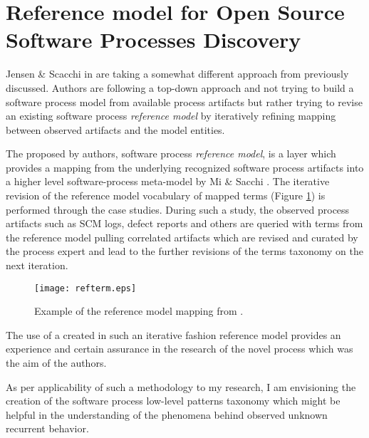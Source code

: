 \section{Reference model for Open Source Software Processes Discovery}
Jensen \& Scacchi in \cite{citeulike:5043664} are taking a somewhat different approach from previously discussed. Authors are following a top-down approach and not trying to build a software process model from available process artifacts but rather trying to revise an existing software process \textit{reference model} by iteratively refining mapping between observed artifacts and the model entities. 

The proposed by authors, software process \textit{reference model}, is a layer which provides a mapping from the underlying recognized software process artifacts into a higher level software-process meta-model by Mi \& Sacchi \cite{citeulike:5128872}. The iterative revision of the reference model vocabulary of mapped terms (Figure \ref{fig:refterm}) is performed through the case studies. During such a study, the observed process artifacts such as SCM logs, defect reports and others are queried with terms from the reference model pulling correlated artifacts which are revised and curated by the process expert and lead to the further revisions of the terms taxonomy on the next iteration.

\begin{figure}[tbp]
   \centering
   \texttt{[image: refterm.eps]}
   \caption{Example of the reference model mapping from \cite{citeulike:5043664}.}
   \label{fig:refterm}
\end{figure}

The use of a created in such an iterative fashion reference model provides an experience and certain assurance in the research of the novel process which was the aim of the authors. 

As per applicability of such a methodology to my research, I am envisioning the creation of the software process low-level patterns taxonomy which might be helpful in the understanding of the phenomena behind observed unknown recurrent behavior.
